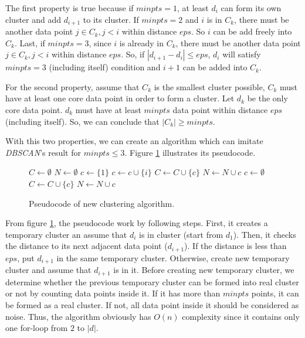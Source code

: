 \documentclass[conference]{IEEEtran}
\begin{document}
The first property is true because if $\textit{minpts} = 1$, at least $d_{i}$ can form its own cluster and add $d_{i+1}$ to its cluster. If $\textit{minpts} = 2$ and $i$ is in $C_{k}$, there must be another data point $j \in C_{k}, j < i$ within distance $\textit{eps}$. So $i$ can be add freely into $C_{k}$. Last, if $\textit{minpts} = 3$, since $i$ is already in $C_{k}$, there must be another data point $j \in C_{k}, j < i$ within distance $\textit{eps}$. So, if $|d_{i+1} - d_{i}| \le \textit{eps}$, $d_{i}$ will satisfy $\textit{minpts} = 3$ (including itself) condition and $i+1$ can be added into $C_{k}$.

For the second property, assume that $C_{k}$ is the smallest cluster possible, $C_{k}$ must have at least one core data point in order to form a cluster. Let $d_{k}$ be the only core data point. $d_{k}$ must have at least $\textit{minpts}$ data point within distance $\textit{eps}$ (including itself). So, we can conclude that $|C_{k}| \ge \textit{minpts}$.

With this two properties, we can create an algorithm which can imitate \textit{DBSCAN}'s result for $\textit{minpts} \le 3$. Figure \ref{fig:clustering_pseudocode} illustrates its pseudocode.

\begin{figure}[H]
\begin{algorithmic}[1]
\State $C \gets \emptyset$
\State $N \gets \emptyset$
\State $c \gets \{1\}$
\State	$c \gets c \cup \{i\}$
	\Else
\State		$C \gets C \cup \{c\}$
		\Else
\State		$N \gets N \cup c$
		\EndIf
		\State $c \gets \emptyset$
	\EndIf
\EndFor
\State
{}
\State		$C \gets C \cup \{c\}$
\Else
\State		$N \gets N \cup c$
\EndIf
\State
\State	{}
\EndProcedure
\end{algorithmic}
\caption{Pseudocode of new clustering algorithm.}
\label{fig:clustering_pseudocode}
\end{figure}

From figure \ref{fig:clustering_pseudocode}, the pseudocode work by following steps. First, it creates a temporary cluster an assume that $d_{i}$ is in cluster (start from $d_{1}$). Then, it checks the distance to its next adjacent data point ($d_{i+1}$). If the distance is less than $eps$, put $d_{i+1}$ in the same temporary cluster. Otherwise, create new temporary cluster and assume that $d_{i+1}$ is in it. Before creating new temporary cluster, we determine whether the previous temporary cluster can be formed into real cluster or not by counting data points inside it. If it has more than $minpts$ points, it can be formed as a real cluster. If not, all data point inside it should be considered as noise. Thus, the algorithm obviously has $O(n)$ complexity since it contains only one for-loop from $2$ to $|d|$.
\end{document}
